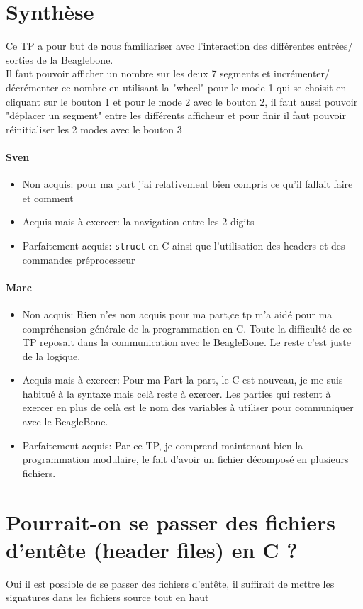 \section{Synthèse}
Ce TP a pour but de nous familiariser avec l'interaction des différentes entrées/ sorties de la Beaglebone.\\
Il faut pouvoir afficher un nombre sur les deux 7 segments et incrémenter/ décrémenter ce nombre en utilisant la "wheel" pour le mode 1 qui se choisit en cliquant sur le bouton 1 et pour le mode 2 avec le bouton 2, il faut aussi pouvoir "déplacer un segment" entre les différents afficheur et pour finir il faut pouvoir réinitialiser les 2 modes avec le bouton 3
\paragraph{Sven}
\begin{itemize}
   \item Non acquis: pour ma part j'ai relativement bien compris ce qu'il fallait faire et comment
   \item Acquis mais à exercer: la navigation entre les 2 digits
   \item Parfaitement acquis: \texttt{struct} en C ainsi que l'utilisation des headers et des commandes préprocesseur
\end{itemize}

\paragraph{Marc}
\begin{itemize}
   \item Non acquis: Rien n'es non acquis pour ma part,ce tp m'a aidé pour ma compréhension générale de la programmation en C. Toute la difficulté de ce TP reposait dans la communication avec le BeagleBone. Le reste c'est juste de la logique.
   \item Acquis mais à exercer: Pour ma Part la part, le C est nouveau, je me suis habitué à la syntaxe mais celà reste à exercer. Les parties qui restent à exercer en plus de celà est le nom des variables à utiliser pour communiquer avec le BeagleBone.
   \item Parfaitement acquis: Par ce TP, je comprend maintenant bien la programmation modulaire, le fait d'avoir un fichier décomposé en plusieurs fichiers. 

\end{itemize}
 
\section{Pourrait-on se passer des fichiers d'entête (header files) en C ?} 
Oui il est possible de se passer des fichiers d'entête, il suffirait de mettre les signatures dans les fichiers source tout en haut

